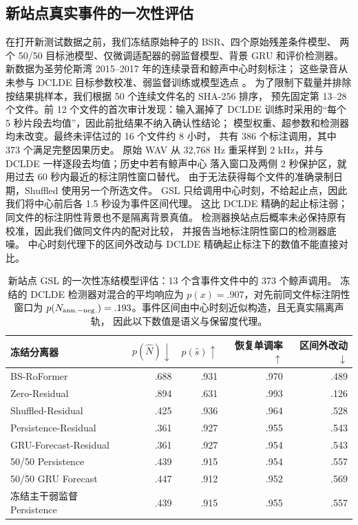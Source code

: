 \documentclass[conference]{IEEEtran}
\begin{document}
\subsection{新站点真实事件的一次性评估}
在打开新测试数据之前，我们冻结原始种子的 BSR、四个原始残差条件模型、
两个 50/50 目标池模型、仅微调适配器的弱监督模型、背景 GRU 和评价检测器。
新数据为圣劳伦斯湾 2015--2017 年的连续录音和鲸声中心时刻标注；
这些录音从未参与 DCLDE 目标参数校准、弱监督训练或模型选点
\cite{kirsebom2020gslData,kirsebom2020gsl}。
为了限制下载量并排除按结果挑样本，我们根据 50 个连续文件名的 SHA-256 排序，
预先固定第 13--28 个文件。前 12 个文件的首次审计发现：输入漏掉了 DCLDE
训练时采用的“每个 5 秒片段去均值”，因此前批结果不纳入确认性结论；
模型权重、超参数和检测器均未改变。最终未评估过的 16 个文件约 8 小时，
共有 386 个标注调用，其中 373 个满足完整因果历史。
原始 WAV 从 32,768 Hz 重采样到 2 kHz，并与 DCLDE 一样逐段去均值；历史中若有鲸声中心
落入窗口及两侧 2 秒保护区，就用过去 60 秒内最近的标注阴性窗口替代。
由于无法获得每个文件的准确录制日期，Shuffled 使用另一个所选文件。
GSL 只给调用中心时刻，不给起止点，因此我们将中心前后各 1.5 秒设为事件区间代理。
这比 DCLDE 精确的起止标注弱；同文件的标注阴性背景也不是隔离背景真值。
检测器换站点后概率未必保持原有校准，因此我们做同文件内的配对比较，
并报告当地标注阴性窗口的检测器底噪。
中心时刻代理下的区间外改动与 DCLDE 精确起止标注下的数值不能直接对比。

\begin{table}[t]
\caption{新站点 GSL 的一次性冻结模型评估：13 个含事件文件中的 373 个鲸声调用。
冻结的 DCLDE 检测器对混合的平均响应为 $p(x)=.907$，对先前同文件标注阴性窗口为
$p(N_{\rm ann.-neg.})=.193$。事件区间由中心时刻近似构造，且无真实隔离声轨，
因此以下数值是语义与保留度代理。}
\label{tab:gsl}\centering\footnotesize
\begin{tabular}{lrrrr}
\toprule
冻结分离器 & $p(\hat N)\downarrow$ & $p(\hat s)\uparrow$ & 恢复单调率$\uparrow$ & 区间外改动$\downarrow$\\
\midrule
BS-RoFormer & .688 & .931 & .970 & .489\\
Zero-Residual & .894 & .631 & .993 & .126\\
Shuffled-Residual & .425 & .936 & .964 & .528\\
Persistence-Residual & .361 & .927 & .955 & .543\\
GRU-Forecast-Residual & .361 & .927 & .954 & .543\\
50/50 Persistence & .439 & .915 & .954 & .557\\
50/50 GRU Forecast & .447 & .912 & .952 & .569\\
冻结主干弱监督 Persistence & .439 & .915 & .955 & .557\\
\bottomrule
\end{tabular}
\end{table}
\end{document}
